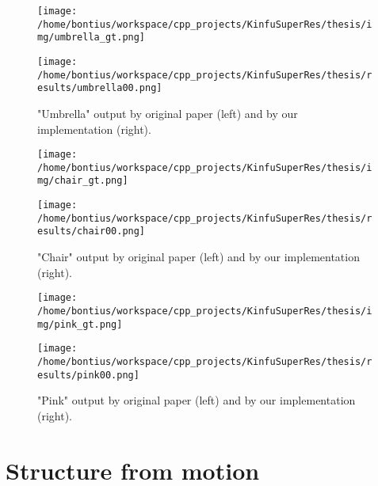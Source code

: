 \documentclass{ucl_thesis}
\begin{document}
\begin{figure}[h!]\centering
	\begin{minipage}[b]{0.49\linewidth}\centering
		\texttt{[image: /home/bontius/workspace/cpp\_projects/KinfuSuperRes/thesis/img/umbrella\_gt.png]}
	\end{minipage}
	\begin{minipage}[b]{0.49\linewidth}\centering
		\texttt{[image: /home/bontius/workspace/cpp\_projects/KinfuSuperRes/thesis/results/umbrella00.png]}
	\end{minipage}
	\caption{"Umbrella" output by original paper (left) and by our implementation (right).}
	\label{fig:umbrella}
\end{figure}

\begin{figure}[h!]\centering
	\begin{minipage}[b]{0.49\linewidth}\centering
		\texttt{[image: /home/bontius/workspace/cpp\_projects/KinfuSuperRes/thesis/img/chair\_gt.png]}
	\end{minipage}
	\begin{minipage}[b]{0.49\linewidth}\centering
		\texttt{[image: /home/bontius/workspace/cpp\_projects/KinfuSuperRes/thesis/results/chair00.png]}
	\end{minipage}
	\caption{"Chair" output by original paper (left) and by our implementation (right).}
	\label{fig:chair}
\end{figure}

\begin{figure}[h!]\centering
	\begin{minipage}[b]{0.49\linewidth}\centering
		\texttt{[image: /home/bontius/workspace/cpp\_projects/KinfuSuperRes/thesis/img/pink\_gt.png]}
	\end{minipage}
	\begin{minipage}[b]{0.49\linewidth}\centering
		\texttt{[image: /home/bontius/workspace/cpp\_projects/KinfuSuperRes/thesis/results/pink00.png]}
	\end{minipage}
	\caption{"Pink" output by original paper (left) and by our implementation (right).}
	\label{fig:pink}
\end{figure}


\section{Structure from motion} 
\label{sec:sfm}
\end{document}
